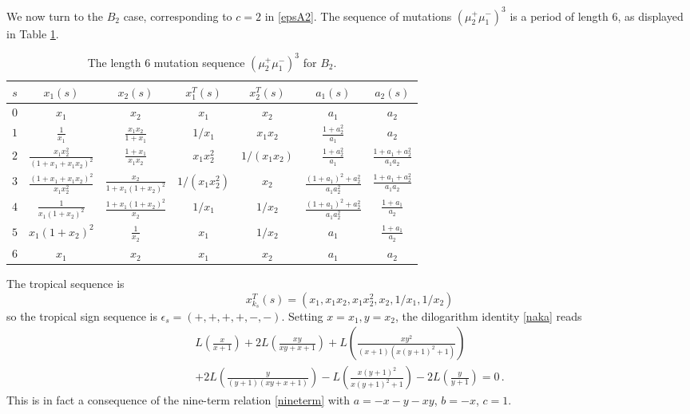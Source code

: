 \documentclass[12pt,reqno]{article}
\numberwithin{equation}{section}
\newcommand{\be}{\begin{equation}}
\newcommand{\ee}{\end{equation}}
\def\eps{\varepsilon}
\def\eps{\epsilon}
\def\ind{s}
\numberwithin{equation}{section}
\begin{document}
We now turn to the $B_2$ case, corresponding to $c=2$ in \eqref{epsA2}.
The sequence of mutations $(\mu_2^+ \mu_1^-)^3$
is a period of length $6$, as displayed in Table \ref{B2table}.
\begin{table}[t]
\begin{center}
\begin{tabular}{|c||c|c||c|c||c|c||}
\hline
$\ind $ & $ x_1(\ind) $ & $ x_2(\ind) $ & $ x_1^T(\ind) $ & $ x_2^T(\ind) $ & $ a_1(\ind)
$ & $ a_2(\ind)$ \\ \hline
$0 $ & $ x_1 $ & $ x_2 $ & $  x_1 $ & $ x_2 $ & $ a_1 $ & $ a_2
$ \\
$1$ & $ \frac{1}{x_1}  $ & $ \frac{x_1x_2}{1+x_1} $ & $  1/x_1 $ & $ x_1 x_2 $ & $ \frac{1+a_2^2}{a_1} $ & $ a_2
$ \\
$2$ & $\frac{x_1x_2^2}{(1+x_1+x_1 x_2)^2} $ & $
\frac{1+x_1}{x_1 x_2} $ & $  x_1x_2^2 $ & $
1/(x_1 x_2) $ & $ \frac{1+a_2^2}{a_1} $ & $ \frac{1+a_1+a_2^2}{a_1a_2}
$ \\
$3$ & $
\frac{(1+x_1+x_1 x_2)^2}{x_1 x_2^2} $ & $
\frac{x_2}{1+x_1(1+x_2)^2} $ & $
1/(x_1x_2^2) $ & $ x_2 $ & $
\frac{(1+a_1)^2+a_2^2}{a_1 a_2^2} $ & $ \frac{1+a_1+a_2^2}{a_1a_2}
$ \\
$4$ & $\frac{1}{x_1(1+x_2)^2} $ & $  \frac{1+x_1(1+x_2)^2} {x_2}$ & $ 1/x_1 $ & $ 1/x_2$ & $
\frac{(1+a_1)^2+a_2^2}{a_1 a_2^2} $ & $ \frac{1+a_1}{a_2}
$ \\
$5$ & $x_1(1+x_2)^2 $ & $ \frac{1}{x_2} $ & $ x_1 $ & $ 1/x_2 $ & $ a_1 $ & $ \frac{1+a_1}{a_2}
$ \\
$6$ & $x_1 $ & $ x_2 $ & $  x_1 $ & $ x_2 $ & $ a_1 $ & $ a_2$ \\ \hline
\end{tabular}
\end{center}
\caption{The length 6 mutation sequence $(\mu_2^+ \mu_1^-)^3$ for $B_2$.}
\label{B2table}
\end{table}
The tropical sequence is
\be
x^T_{k_\ind}(\ind)=(x_1,x_1 x_2, x_1 x_2^2,x_2,1/x_1,1/x_2)
\ee
so the tropical sign sequence is $\eps_\ind=(+,+,+,+,-,-)$.
Setting $x=x_1,y=x_2$, the dilogarithm identity \eqref{naka} reads
\be
\begin{split}
L\left(\frac{x}{x+1}\right)+2   L\left(\frac{x y}{x y+x+1}\right)
 +L\left(\frac{x y^2}{(x+1) \left(x (y+1)^2+1\right)}\right)
\\
+2 L\left(\frac{y}{(y+1) (x   y+x+1)}\right)
-L\left(\frac{x (y+1)^2}{x   (y+1)^2+1}\right)
  -2   L\left(\frac{y}{y+1}\right)
=0\, .
\end{split}
\ee
This is in fact a consequence of the nine-term relation \eqref{nineterm} with $a=-x-y-xy$, $b=-x$, $c=1$.
\end{document}

